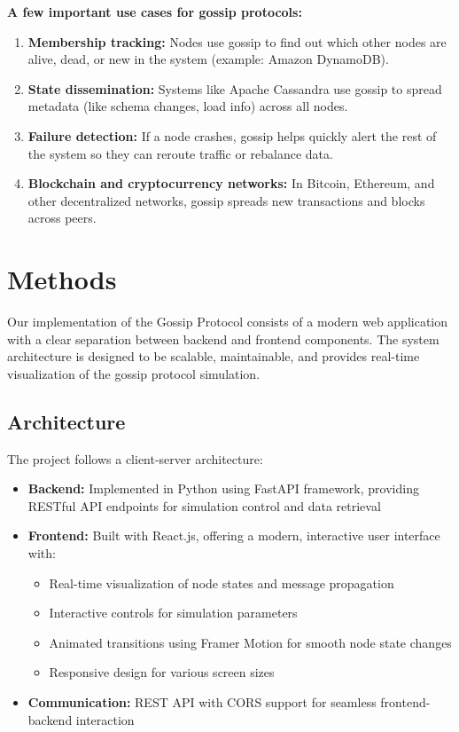 \documentclass[a4paper,12pt]{article}
\begin{document}
\textbf{A few important use cases for gossip protocols:}
\begin{enumerate}
    \item \textbf{Membership tracking:} Nodes use gossip to find out which other nodes are alive, dead, or new in the system (example: Amazon DynamoDB).
    \item \textbf{State dissemination:} Systems like Apache Cassandra use gossip to spread metadata (like schema changes, load info) across all nodes.
    \item \textbf{Failure detection:} If a node crashes, gossip helps quickly alert the rest of the system so they can reroute traffic or rebalance data.
    \item \textbf{Blockchain and cryptocurrency networks:} In Bitcoin, Ethereum, and other decentralized networks, gossip spreads new transactions and blocks across peers.
\end{enumerate}

\section{Methods}

Our implementation of the Gossip Protocol consists of a modern web application with a clear separation between backend and frontend components. The system architecture is designed to be scalable, maintainable, and provides real-time visualization of the gossip protocol simulation.

\subsection{Architecture}
The project follows a client-server architecture:
\begin{itemize}
    \item \textbf{Backend:} Implemented in Python using FastAPI framework, providing RESTful API endpoints for simulation control and data retrieval
    \item \textbf{Frontend:} Built with React.js, offering a modern, interactive user interface with:
        \begin{itemize}
            \item Real-time visualization of node states and message propagation
            \item Interactive controls for simulation parameters
            \item Animated transitions using Framer Motion for smooth node state changes
            \item Responsive design for various screen sizes
        \end{itemize}
    \item \textbf{Communication:} REST API with CORS support for seamless frontend-backend interaction
\end{itemize}
\end{document}
